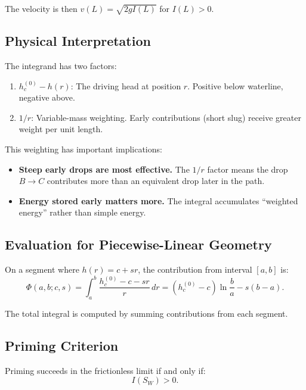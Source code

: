 \documentclass[11pt,a4paper]{article}
\theoremstyle{definition}
\begin{document}
The velocity is then $v(L) = \sqrt{2gI(L)}$ for $I(L) > 0$.

\subsection{Physical Interpretation}

The integrand has two factors:
\begin{enumerate}[nosep,leftmargin=2em]
  \item $h_c^{(0)} - h(r)$: The driving head at position $r$. Positive below waterline, negative above.
  \item $1/r$: Variable-mass weighting. Early contributions (short slug) receive greater weight per unit length.
\end{enumerate}

This weighting has important implications:
\begin{itemize}[nosep,leftmargin=2em]
  \item \textbf{Steep early drops are most effective.} The $1/r$ factor means the drop $B \to C$ contributes more than an equivalent drop later in the path.
  \item \textbf{Energy stored early matters more.} The integral accumulates ``weighted energy'' rather than simple energy.
\end{itemize}

\subsection{Evaluation for Piecewise-Linear Geometry}

On a segment where $h(r) = c + sr$, the contribution from interval $[a,b]$ is:
\begin{equation}
  \Phi(a, b; c, s) = \int_a^b \frac{h_c^{(0)} - c - sr}{r}\,dr = (h_c^{(0)} - c)\ln\frac{b}{a} - s(b-a).
  \label{eq:Phi-def}
\end{equation}

The total integral is computed by summing contributions from each segment.

\subsection{Priming Criterion}

\begin{criterion}
Priming succeeds in the frictionless limit if and only if:
\begin{equation}
  I(S_W) > 0.
  \label{eq:priming-criterion}
\end{equation}
\end{criterion}
\end{document}
